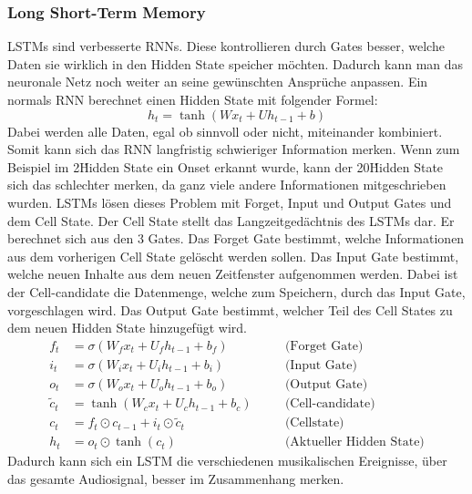 \subsubsection{Long Short-Term Memory}
LSTMs sind verbesserte RNNs.
Diese kontrollieren durch Gates besser, welche Daten sie wirklich in den Hidden State speicher möchten.
Dadurch kann man das neuronale Netz noch weiter an seine gewünschten Ansprüche anpassen.
Ein normals RNN berechnet einen Hidden State mit folgender Formel:
\begin{equation}
h_t = \tanh(W x_t + U h_{t-1} + b)
\end{equation}
Dabei werden alle Daten, egal ob sinnvoll oder nicht, miteinander kombiniert.
Somit kann sich das RNN langfristig schwieriger Information merken.
Wenn zum Beispiel im 2\. Hidden State ein Onset erkannt wurde, kann der 20\. Hidden State
sich das schlechter merken, da ganz viele andere Informationen mitgeschrieben wurden.
LSTMs lösen dieses Problem mit Forget, Input und Output Gates und dem Cell State.
Der Cell State stellt das Langzeitgedächtnis des LSTMs dar.
Er berechnet sich aus den 3 Gates.
Das Forget Gate bestimmt, welche Informationen aus dem vorherigen Cell State gelöscht werden sollen.
Das Input Gate bestimmt, welche neuen Inhalte aus dem neuen Zeitfenster aufgenommen werden.
Dabei ist der Cell-candidate die Datenmenge, welche zum Speichern, durch das Input Gate, vorgeschlagen wird.
Das Output Gate bestimmt, welcher Teil des Cell States zu dem neuen Hidden State hinzugefügt wird.
\begin{align}
f_t &= \sigma(W_f x_t + U_f h_{t-1} + b_f) \quad &&\text{(Forget Gate)} \\
i_t &= \sigma(W_i x_t + U_i h_{t-1} + b_i) \quad &&\text{(Input Gate)} \\
o_t &= \sigma(W_o x_t + U_o h_{t-1} + b_o) \quad &&\text{(Output Gate)} \\
\tilde{c}_t &= \tanh(W_c x_t + U_c h_{t-1} + b_c) \quad &&\text{(Cell-candidate)} \\
c_t &= f_t \odot c_{t-1} + i_t \odot \tilde{c}_t \quad &&\text{(Cellstate)} \\
h_t &= o_t \odot \tanh(c_t) \quad &&\text{(Aktueller Hidden State)}
\end{align}
Dadurch kann sich ein LSTM die verschiedenen musikalischen Ereignisse,
über das gesamte Audiosignal, besser im Zusammenhang merken.

